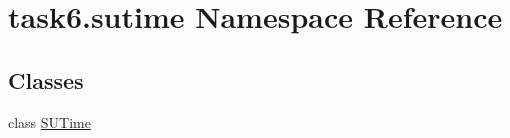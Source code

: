 \hypertarget{namespacetask6_1_1sutime}{}\section{task6.\+sutime Namespace Reference}
\label{namespacetask6_1_1sutime}
\subsection*{Classes}
\begin{DoxyCompactItemize}
\item 
class \hyperlink{classtask6_1_1sutime_1_1SUTime}{S\+U\+Time}
\end{DoxyCompactItemize}
